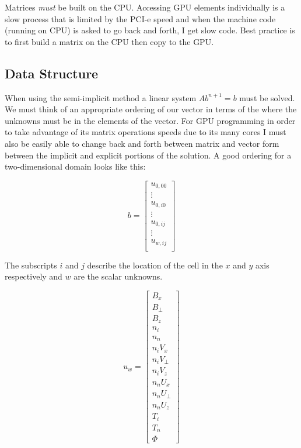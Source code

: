\documentclass[12pt,upcase]{umlthesis}
\begin{document}
Matrices {\it must\/} be built on the CPU\@. Accessing GPU elements individually is a slow process that is limited by the PCI-e speed and when the machine code (running on CPU) is asked to go back and forth, I get slow code. Best practice is to first build a matrix on the CPU then copy to the GPU\@.

\subsection{Data Structure}\label{sec:datastructure}

When using the semi-implicit method a linear system $Ab^{n+1}=b$ must be solved. We must think of an appropriate ordering of our vector in terms of the where the unknowns must be in the elements of the vector. For GPU programming in order to take advantage of its matrix operations speeds due to its many cores I must also be easily able to change back and forth between matrix and vector form between the implicit and explicit portions of the solution. A good ordering for a two-dimensional domain looks like this:

\begin{equation}
	b =
\begin{bmatrix}
	u_{0,00} \\
	\vdots \\
	u_{0,i0} \\
	\vdots \\
	u_{0,ij} \\
	\vdots \\
	u_{w,ij} \\
\end{bmatrix}
\end{equation}

The subscripts $i$ and $j$ describe the location of the cell in the $x$ and $y$ axis respectively and $w$ are the scalar unknowns.

\begin{equation}
	u_w = 
	\begin{bmatrix}
		B_x \\
		B_{\perp} \\
		B_z \\
		n_i \\
		n_n \\
		n_i V_x \\
		n_i V_{\perp} \\
		n_i V_z \\
		n_n U_x \\
		n_n U_{\perp} \\
		n_n U_z \\
		T_i \\
		T_n \\
		\Phi
	\end{bmatrix}
\end{equation}
\end{document}
